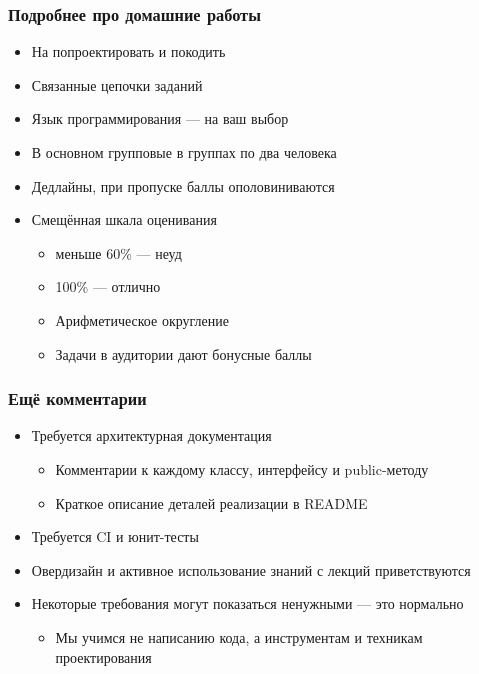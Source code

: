 \documentclass{../cscslides}
\begin{document}
    \begin{frame}
        \frametitle{Подробнее про домашние работы}
        \begin{itemize}
            \item На попроектировать и покодить
            \item Связанные цепочки заданий
            \item Язык программирования --- на ваш выбор
            \item В основном групповые в группах по два человека
            \item Дедлайны, при пропуске баллы ополовиниваются
            \item Смещённая шкала оценивания 
            \begin{itemize}
                \item меньше 60\% --- неуд
                \item 100\% --- отлично
                \item Арифметическое округление
                \item Задачи в аудитории дают бонусные баллы
            \end{itemize} 
        \end{itemize}
    \end{frame}

    \begin{frame}
        \frametitle{Ещё комментарии}
        \begin{itemize}
            \item Требуется архитектурная документация
            \begin{itemize}
                \item Комментарии к каждому классу, интерфейсу и public-методу
                \item Краткое описание деталей реализации в README
            \end{itemize}
            \item Требуется CI и юнит-тесты
            \item Овердизайн и активное использование знаний с лекций приветствуются
            \item Некоторые требования могут показаться ненужными --- это нормально
            \begin{itemize}
                \item Мы учимся не написанию кода, а инструментам и техникам проектирования
            \end{itemize}
        \end{itemize}
    \end{frame}
\end{document}
